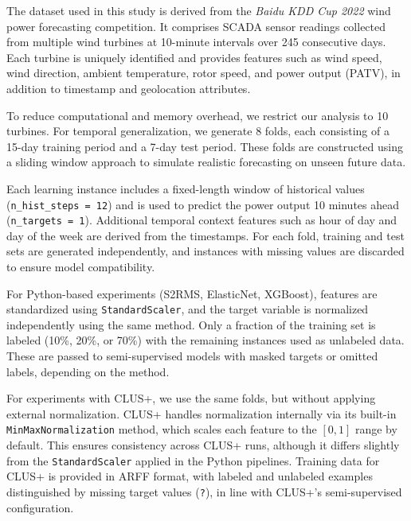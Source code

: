 The dataset used in this study is derived from the \textit{Baidu KDD Cup 2022} wind power forecasting competition. It comprises SCADA sensor readings collected from multiple wind turbines at 10-minute intervals over 245 consecutive days. Each turbine is uniquely identified and provides features such as wind speed, wind direction, ambient temperature, rotor speed, and power output (PATV), in addition to timestamp and geolocation attributes.

To reduce computational and memory overhead, we restrict our analysis to 10 turbines. For temporal generalization, we generate 8 folds, each consisting of a 15-day training period and a 7-day test period. These folds are constructed using a sliding window approach to simulate realistic forecasting on unseen future data.

Each learning instance includes a fixed-length window of historical values (\texttt{n\_hist\_steps = 12}) and is used to predict the power output 10 minutes ahead (\texttt{n\_targets = 1}). Additional temporal context features such as hour of day and day of the week are derived from the timestamps. For each fold, training and test sets are generated independently, and instances with missing values are discarded to ensure model compatibility.

For Python-based experiments (S2RMS, ElasticNet, XGBoost), features are standardized using \texttt{StandardScaler}, and the target variable is normalized independently using the same method. Only a fraction of the training set is labeled (10\%, 20\%, or 70\%) with the remaining instances used as unlabeled data. These are passed to semi-supervised models with masked targets or omitted labels, depending on the method.

For experiments with CLUS+, we use the same folds, but without applying external normalization. CLUS+ handles normalization internally via its built-in \texttt{MinMaxNormalization} method, which scales each feature to the $ [0,1] $ range by default. This ensures consistency across CLUS+ runs, although it differs slightly from the \texttt{StandardScaler} applied in the Python pipelines. Training data for CLUS+ is provided in ARFF format, with labeled and unlabeled examples distinguished by missing target values (\texttt{?}), in line with CLUS+'s semi-supervised configuration.